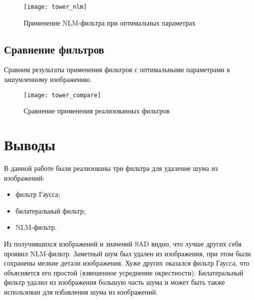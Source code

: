 \begin{figure}[H]
	\centering
	\texttt{[image: tower\_nlm]}
	\caption{Применение NLM-фильтра при оптимальных параметрах}
\end{figure}

\subsection{Сравнение фильтров}

Сравним результаты применения фильтров с оптимальными параметрами к зашумленному изображению.

\begin{figure}[H]
	\centering
	\texttt{[image: tower\_compare]}
	\caption{Сравнение применения реализованных фильтров}
\end{figure}

\section{Выводы}

В данной работе были реализованы три фильтра для удаление шума из изображений:

\begin{itemize}
	\item фильтр Гаусса;
	\item билатеральный фильтр;
	\item NLM-фильтр.
\end{itemize}

Из получившихся изображений и значений SAD видно, что лучше других себя проявил NLM-фильтр. Заметный шум был удален из изображения, при этом были сохранены мелкие детали изображения. Хуже других оказался фильтр Гаусса, что объясняется его простой (взвешенное усреднение окрестности). Билатеральный фильтр удалил из изображения большую часть шума и может быть также использован для избавления шума из изображений.


